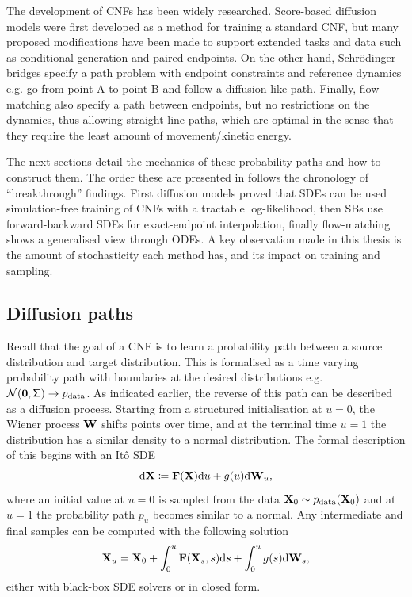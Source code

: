 The development of \acp{CNF} has been widely researched. Score-based diffusion models were first developed as a method for training a standard \ac{CNF}, but many proposed modifications have been made to support extended tasks and data such as conditional generation and paired endpoints. On the other hand, Schr\"odinger bridges specify a path problem with endpoint constraints and reference dynamics e.g. go from point A to point B and follow a diffusion-like path. Finally, flow matching also specify a path between endpoints, but no restrictions on the dynamics, thus allowing straight-line paths, which are optimal in the sense that they require the least amount of movement/kinetic energy.


The next sections detail the mechanics of these probability paths and how to construct them. The order these are presented in follows the chronology of ``breakthrough'' findings. First diffusion models proved that \acp{SDE} can be used simulation-free training of \acp{CNF} with a tractable log-likelihood, then \acp{SB} use forward-backward \acp{SDE} for exact-endpoint interpolation, finally flow-matching shows a generalised view through \acp{ODE}. A key observation made in this thesis is the amount of stochasticity each method has, and its impact on training and sampling.


\subsection{Diffusion paths}
\label{sec:diffusion-paths}

Recall that the goal of a \ac{CNF} is to learn a probability path between a source distribution and target distribution. This is formalised as a time varying probability path with boundaries at the desired distributions e.g. ${\mathcal{N}}(\bm0,{\mathsf\Sigma})\rightarrow p_{\rm{data}}$. As indicated earlier, the reverse of this path can be described as a diffusion process. Starting from a structured initialisation at $u=0$, the Wiener process ${\mathbf{W}}$ shifts points over time, and at the terminal time $u=1$ the distribution has a similar density to a normal distribution.
The formal description of this begins with an It\^o \ac{SDE}
\[
\mathrm{d}{\mathbf{X}} \coloneqq {\mathbf{F}}({\mathbf{X}})\mathrm{d} u + g(u)\mathrm{d}{\mathbf{W}}_u,
\]
where an initial value at $u=0$ is sampled from the data ${\mathbf{X}}_0\sim p_{\rm{data}}({\mathbf{X}}_0)$ and at $u=1$ the probability path $p_u$ becomes similar to a normal. Any intermediate and final samples can be computed with the following solution
\[
{\mathbf{X}}_u = {\mathbf{X}}_0 + \int_0^u{\mathbf{F}}({\mathbf{X}}_s,s)\mathrm{d} s + \int_0^ug(s)\mathrm{d} {\mathbf{W}}_s,
\label{eq:sdesolv}
\]
either with black-box \ac{SDE} solvers or in closed form.

